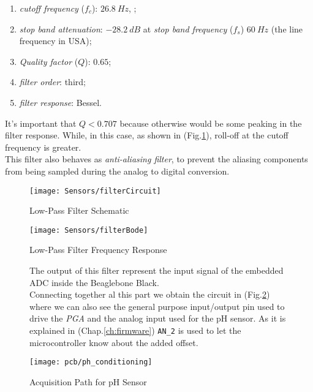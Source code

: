 \begin{enumerate}
	\item \textit{cutoff frequency} ($f_c$): $26.8\ Hz$, ;
\item \textit{stop band attenuation}: $-28.2\ dB$ at \textit{stop band frequency} ($f_s$) $60\ Hz$ (the line frequency in USA);
\item \textit{Quality factor} ($Q$): $0.65$;
\item \textit{filter order}: third;
\item \textit{filter response}: Bessel.
\end{enumerate}

It's important that $Q < 0.707$ because otherwise would be some peaking in the filter response. While, in this case, as shown in (Fig.\ref{Fig:filterbode}), roll-off at the cutoff frequency is greater.\\
This filter also behaves as \textit{anti-aliasing filter}, to prevent the aliasing components from being sampled during the analog to digital conversion.\\



\newpage
\clearpage

\begin{figure}[h]
	\begin{center}
	\texttt{[image: Sensors/filterCircuit]}
	\caption{Low-Pass Filter Schematic}
	\label{Fig:filterCircuit}

	\centering
	\texttt{[image: Sensors/filterBode]}
	\caption{Low-Pass Filter Frequency Response}
	\label{Fig:filterbode}
	\end{center}
\end{figure}
	
	\newpage
	\begin{figure}[t]
The output of this filter represent the input signal of the embedded ADC inside the Beaglebone Black.\\

Connecting together al this part we obtain the circuit in (Fig.\ref{Fig:pHConditioning}) where we can also see the general purpose input/output pin used to drive the \textit{PGA} and the analog input used for the pH sensor. As it is explained in (Chap.\ref{ch:firmware}) \texttt{AN\_2} is used to let the microcontroller know about the added offset.

\vspace{10mm}

\centering
\texttt{[image: pcb/ph\_conditioning]}
\caption{Acquisition Path for pH Sensor}
\label{Fig:pHConditioning}
\end{figure}






